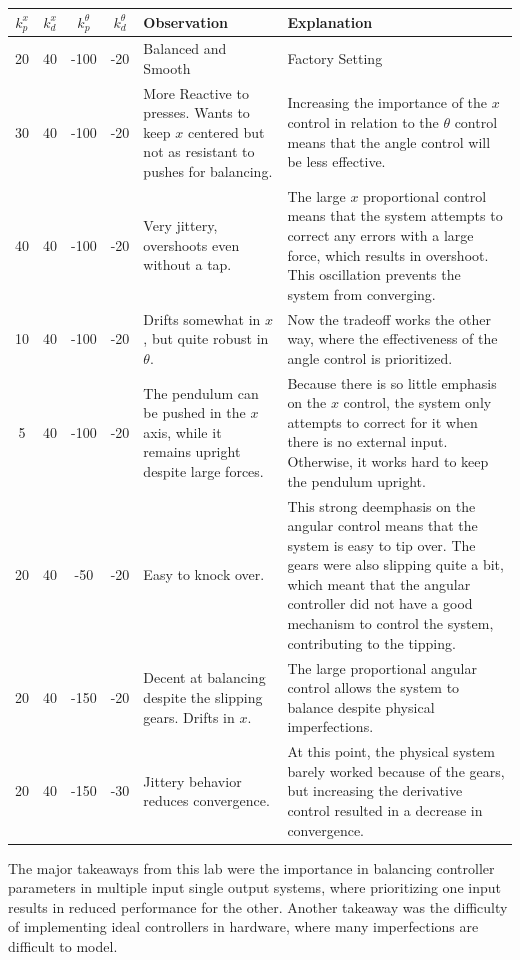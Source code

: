\documentclass{journal}
\begin{document}
\begin{center}
\begin{tabular}{|c c c c| p{3cm} | p{5cm} |}
	\hline
	$k_p^x$ & $k_d^x$ & $k_p^\theta$ & $k_d^\theta$ & Observation & Explanation \\
	\hline
	20 & 40 & -100 & -20 & Balanced and Smooth & Factory Setting \\
	30 & 40 & -100 & -20 & More Reactive to presses.  Wants to keep $x$ centered but not as resistant to pushes for balancing. & Increasing the importance of the $x$ control in relation to the $\theta$ control means that the angle control will be less effective.\\
	40 & 40 & -100 & -20 & Very jittery, overshoots even without a tap. & The large $x$ proportional control means that the system attempts to correct any errors with a large force, which results in overshoot.  This oscillation prevents the system from converging.\\
	10 & 40 & -100 & -20 & Drifts somewhat in $x$, but quite robust in $\theta$.& Now the tradeoff works the other way, where the effectiveness of the angle control is prioritized.\\
	5  & 40 & -100 &-20 & The pendulum can be pushed in the $x$ axis, while it remains upright despite large forces. & Because there is so little emphasis on the $x$ control, the system only attempts to correct for it when there is no external input.  Otherwise, it works hard to keep the pendulum upright.\\
	20 & 40 & -50 & -20 & Easy to knock over. & This strong deemphasis on the angular control means that the system is easy to tip over.  The gears were also slipping quite a bit, which meant that the angular controller did not have a good mechanism to control the system, contributing to the tipping.\\
	20 & 40 & -150 & -20 & Decent at balancing despite the slipping gears.  Drifts in $x$. & The large proportional angular control allows the system to balance despite physical imperfections.\\
	20 & 40 & -150 & -30 & Jittery behavior reduces convergence. & At this point, the physical system barely worked because of the gears, but increasing the derivative control resulted in a decrease in convergence. \\
	\hline
\end{tabular}
\end{center}

The major takeaways from this lab were the importance in balancing controller parameters in multiple input single output systems, where prioritizing one input results in reduced performance for the other.  Another takeaway was the difficulty of implementing ideal controllers in hardware, where many imperfections are difficult to model.


\end{document}
